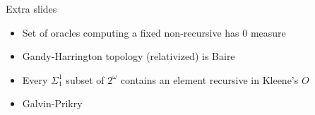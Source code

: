 \begin{frame}{Extra slides}
  \begin{itemize}
    \item Set of oracles computing a fixed non-recursive has 0 measure
    \item Gandy-Harrington topology (relativized) is Baire
    \item Every $\Sigma_1^1$ subset of $2^\omega$ contains an element
      recursive in Kleene's $O$
    \item Galvin-Prikry
  \end{itemize}
\end{frame}
